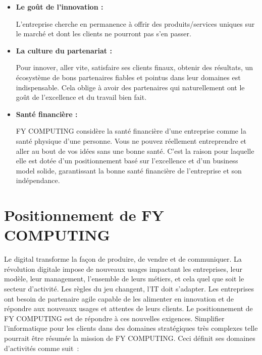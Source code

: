 \documentclass[a4paper,11pt,oneside]{report}
\begin{document}
\begin{itemize}
\item \textbf{Le goût de l’innovation :}

L’entreprise cherche en permanence à offrir des produits/services uniques sur le marché et dont les clients ne pourront pas s’en passer.

\item \textbf{La culture du partenariat :}

Pour innover, aller vite, satisfaire ses clients finaux, obtenir des résultats, un écosystème de bons partenaires fiables et pointus dans leur domaines est indispensable. Cela oblige à avoir des partenaires qui naturellement ont le goût de l’excellence et du travail bien fait.

\item \textbf{Santé financière :}

FY COMPUTING considère la santé financière d’une entreprise comme la santé physique d’une personne. Vous ne pouvez réellement entreprendre et aller au bout de vos idées sans une bonne santé. C’est la raison pour laquelle elle est dotée d’un positionnement basé sur l’excellence et d’un business model solide, garantissant la bonne santé financière de l’entreprise et son indépendance.
\end{itemize}


\section{Positionnement de FY COMPUTING}
Le digital transforme la façon de produire, de vendre et de communiquer. La révolution digitale impose de nouveaux usages impactant les entreprises, leur modèle, leur management, l’ensemble de leurs métiers, et cela quel que soit le secteur d’activité. Les règles du jeu changent, l’IT doit s’adapter. Les entreprises ont besoin de partenaire agile capable de les alimenter en innovation et de répondre aux nouveaux usages et attentes de leurs clients. Le positionnement de FY COMPUTING est de répondre à ces nouvelles exigences.
\newline
\newline
Simplifier l’informatique pour les clients dans des domaines stratégiques très complexes telle pourrait être résumée la mission de FY COMPUTING. Ceci définit ses domaines d’activités comme suit :
\end{document}
